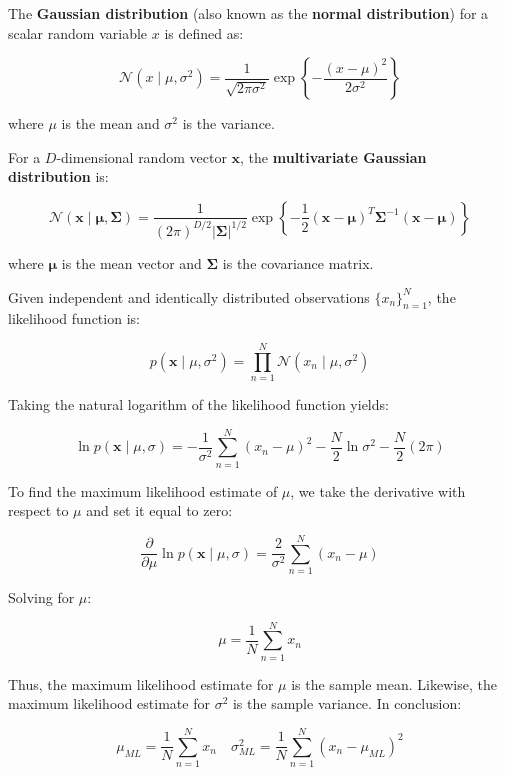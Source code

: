 The \textbf{Gaussian distribution} (also known as the \textbf{normal distribution}) for a scalar random variable $x$ is defined as:

\[
    \mathcal{N}(x \mid \mu, \sigma^2)
    = \frac{1}{\sqrt{2\pi\sigma^2}} \exp\left\{-\frac{(x - \mu)^2}{2\sigma^2}\right\}
\]

where $\mu$ is the mean and $\sigma^2$ is the variance.

For a $D$-dimensional random vector $\mathbf{x}$, the \textbf{multivariate Gaussian distribution} is:

\[
    \mathcal{N}(\mathbf{x} \mid \boldsymbol{\mu}, \boldsymbol{\Sigma})
    = \frac{1}{(2\pi)^{D/2}|\boldsymbol{\Sigma}|^{1/2}} \exp\left\{-\frac{1}{2}(\mathbf{x} - \boldsymbol{\mu})^T\boldsymbol{\Sigma}^{-1}(\mathbf{x} - \boldsymbol{\mu})\right\}
\]

where $\boldsymbol{\mu}$ is the mean vector and $\boldsymbol{\Sigma}$ is the covariance matrix.

Given independent and identically distributed observations $\{x_n\}_{n=1}^N$, the likelihood function is:

\[
    p(\mathbf{x} \mid \mu, \sigma^2) = \prod_{n = 1}^{N}\mathcal{N}(x_n \mid \mu, \sigma^2)
\]

Taking the natural logarithm of the likelihood function yields:

\[
    \ln{p(\mathbf{x} \mid \mu, \sigma)} = -\frac{1}{\sigma^2}\sum_{n=1}^{N}(x_n - \mu)^2 - \frac{N}{2}\ln \sigma^2 - \frac{N}{2}(2 \pi)
\]

To find the maximum likelihood estimate of $\mu$, we take the derivative with respect to $\mu$ and set it equal to zero:

\[
    \frac{\partial}{\partial \mu} \ln p(\mathbf{x} \mid \mu, \sigma)
    = \frac{2}{\sigma^2}\sum_{n=1}^{N}{(x_n - \mu)}
\]

Solving for $\mu$:

\[
    \mu = \frac{1}{N}\sum_{n=1}^{N}x_n
\]

Thus, the maximum likelihood estimate for $\mu$ is the sample mean.
Likewise, the maximum likelihood estimate for $\sigma^2$ is the sample variance.
In conclusion:

\[
    \mu_{ML} = \frac{1}{N}\sum_{n=1}^{N}{x_n}
    \quad
    \sigma^2_{ML} =  \frac{1}{N}\sum_{n=1}^{N}{ (x_n - \mu_{ML})^2 }
\]